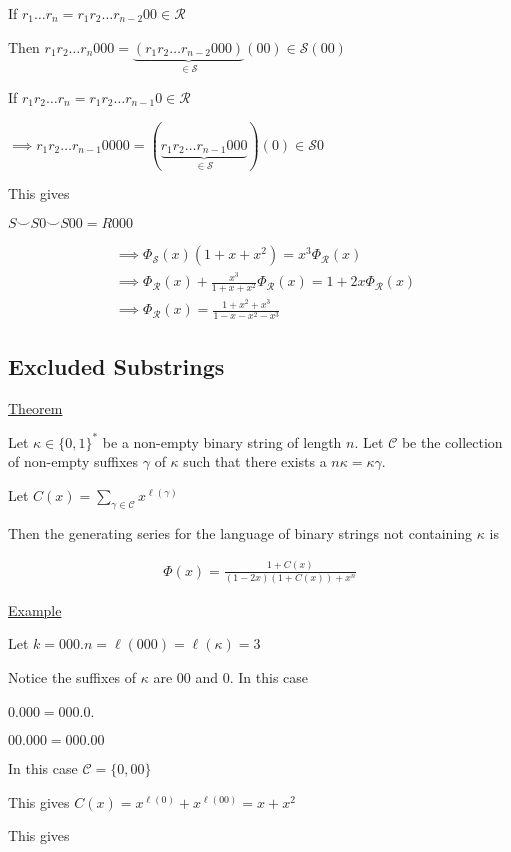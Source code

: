 \documentclass{article}
\newcommand\mc{\mathcal}
\begin{document}
If $r_1 \ldots r_n = r_1r_2 \ldots r_{n-2}00 \in \mc{R}$

Then $r_1r_2 \ldots r_n 000 = \underbrace{(r_1r_2 \ldots r_{n-2}000)}_{\in \mc{S}}(00) \in \mc{S}(00)$

If $r_1r_2 \ldots r_n = r_1r_2 \ldots r_{n-1}0 \in \mc{R}$

$\implies r_1r_2 \ldots r_{n-1}0000 = (\underbrace{r_1r_2 \ldots r_{n-1}000}_{\in \mc{S}})(0) \in \mc{S}0$

This gives

$S \smile S0 \smile S00 = R000$

\begin{align*}
    &\implies \Phi_{\mc{S}}(x)(1+x+x^2) = x^3 \Phi_{\mc{R}}(x) \\
    &\implies \Phi_{\mc{R}}(x) + \frac{x^3}{1+x+x^2} \Phi_{\mc{R}}(x) = 1 + 2x \Phi_{\mc{R}}(x) \\
    &\implies \Phi_{\mc{R}}(x) = \frac{1+x^2+x^3}{1-x-x^2-x^3}
\end{align*}

\subsection{Excluded Substrings}

\underline{Theorem}

Let $\kappa \in \{0,1\}^*$ be a non-empty binary string of length $n$. Let $\mc{C}$ be the collection of non-empty suffixes $\gamma$ of $\kappa$ such that there exists a $n\kappa = \kappa \gamma$.

Let $C(x) = \sum_{\gamma \in \mc{C}} x^{\ell(\gamma)}$

Then the generating series for the language of binary strings not containing $\kappa$ is 

\begin{align*}
    \Phi(x) = \frac{1 + C(x)}{(1-2x)(1+C(x))+x^n}
\end{align*}

\underline{Example}

Let $k=000. n= \ell(000) = \ell(\kappa) = 3$

Notice the suffixes of $\kappa$ are $00$ and $0$. In this case 

$0.000 = 000.0$. 

$00.000 = 000.00$

In this case $\mc{C} = \{0,00\}$

This gives $C(x) = x^{\ell(0)} + x^{\ell(00)} = x + x^2$

This gives 
\end{document}
